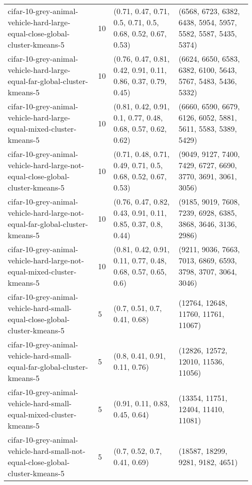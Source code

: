 \begin{longtable}{llll}
            cifar-10-grey-animal-vehicle-hard-large-equal-close-global-cluster-kmeans-5 &             10 &   (0.71, 0.47, 0.71, 0.5, 0.71, 0.5, 0.68, 0.52, 0.67, 0.53) & (6568, 6723, 6382, 6438, 5954, 5957, 5582, 5587, 5435, 5374) \\
              cifar-10-grey-animal-vehicle-hard-large-equal-far-global-cluster-kmeans-5 &             10 & (0.76, 0.47, 0.81, 0.42, 0.91, 0.11, 0.86, 0.37, 0.79, 0.45) & (6624, 6650, 6583, 6382, 6100, 5643, 5767, 5483, 5436, 5332) \\
                   cifar-10-grey-animal-vehicle-hard-large-equal-mixed-cluster-kmeans-5 &             10 &  (0.81, 0.42, 0.91, 0.1, 0.77, 0.48, 0.68, 0.57, 0.62, 0.62) & (6660, 6590, 6679, 6126, 6052, 5881, 5611, 5583, 5389, 5429) \\
        cifar-10-grey-animal-vehicle-hard-large-not-equal-close-global-cluster-kmeans-5 &             10 &  (0.71, 0.48, 0.71, 0.49, 0.71, 0.5, 0.68, 0.52, 0.67, 0.53) & (9049, 9127, 7400, 7429, 6727, 6690, 3770, 3691, 3061, 3056) \\
          cifar-10-grey-animal-vehicle-hard-large-not-equal-far-global-cluster-kmeans-5 &             10 &  (0.76, 0.47, 0.82, 0.43, 0.91, 0.11, 0.85, 0.37, 0.8, 0.44) & (9185, 9019, 7608, 7239, 6928, 6385, 3868, 3646, 3136, 2986) \\
               cifar-10-grey-animal-vehicle-hard-large-not-equal-mixed-cluster-kmeans-5 &             10 &  (0.81, 0.42, 0.91, 0.11, 0.77, 0.48, 0.68, 0.57, 0.65, 0.6) & (9211, 9036, 7663, 7013, 6869, 6593, 3798, 3707, 3064, 3046) \\
            cifar-10-grey-animal-vehicle-hard-small-equal-close-global-cluster-kmeans-5 &              5 &                                 (0.7, 0.51, 0.7, 0.41, 0.68) &                          (12764, 12648, 11760, 11761, 11067) \\
              cifar-10-grey-animal-vehicle-hard-small-equal-far-global-cluster-kmeans-5 &              5 &                                (0.8, 0.41, 0.91, 0.11, 0.76) &                          (12826, 12572, 12010, 11536, 11056) \\
                   cifar-10-grey-animal-vehicle-hard-small-equal-mixed-cluster-kmeans-5 &              5 &                               (0.91, 0.11, 0.83, 0.45, 0.64) &                          (13354, 11751, 12404, 11410, 11081) \\
        cifar-10-grey-animal-vehicle-hard-small-not-equal-close-global-cluster-kmeans-5 &              5 &                                 (0.7, 0.52, 0.7, 0.41, 0.69) &                             (18587, 18299, 9281, 9182, 4651) \\

\end{longtable}
